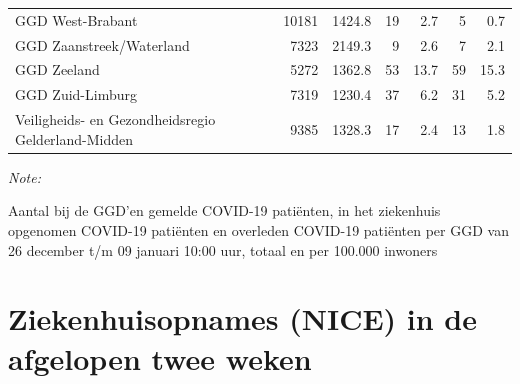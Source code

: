 \documentclass[
  english,
  man,floatsintext]{apa6}
\begin{document}
\begin{table}
\begin{threeparttable}
\begin{tabular}{lrrrrrr}
GGD West-Brabant & 10181 & 1424.8 & 19 & 2.7 & 5 & 0.7\\
GGD Zaanstreek/Waterland & 7323 & 2149.3 & 9 & 2.6 & 7 & 2.1\\
GGD Zeeland & 5272 & 1362.8 & 53 & 13.7 & 59 & 15.3\\
GGD Zuid-Limburg & 7319 & 1230.4 & 37 & 6.2 & 31 & 5.2\\
Veiligheids- en Gezondheidsregio Gelderland-Midden & 9385 & 1328.3 & 17 & 2.4 & 13 & 1.8\\
\bottomrule
\end{tabular}
\begin{tablenotes}
\item \textit{Note: } 
\item Aantal bij de GGD’en gemelde COVID-19 patiënten, in het ziekenhuis opgenomen COVID-19 patiënten en overleden COVID-19 patiënten per GGD van 26 december t/m 09 januari 10:00 uur, totaal en per 100.000 inwoners
\end{tablenotes}
\end{threeparttable}
\endgroup{}
\end{table}

\newpage

\hypertarget{ziekenhuisopnames-nice-in-de-afgelopen-twee-weken}{%
\section{Ziekenhuisopnames (NICE) in de afgelopen twee weken}\label{ziekenhuisopnames-nice-in-de-afgelopen-twee-weken}}
\end{document}

